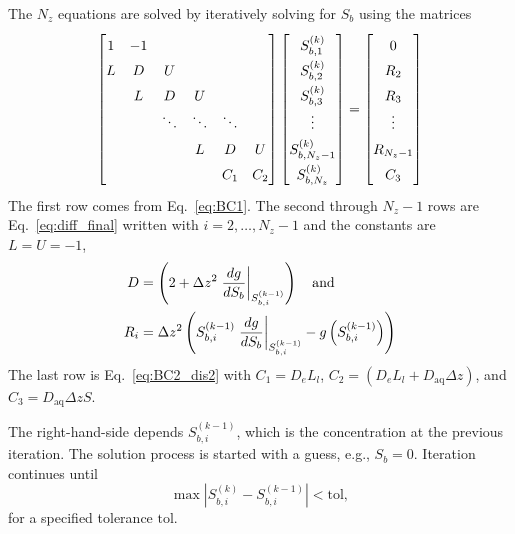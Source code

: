 \documentclass[letterpaper, twoside]{article}
\numberwithin{equation}{section}
\begin{document}
The $N_z$ equations are solved by iteratively solving for $S_b$ using the matrices
\begin{equation}
  \label{eq:system}
  \renewcommand*{\arraystretch}{1.5}
  \begin{bmatrix}
    1 &-1  &   &   &   & \\
    L &  D & U &  &   & \\
    ~ & L &  D & U &  & \\
    ~ & ~ & \ddots &  \ddots & \ddots & \\
    ~ & ~ & ~ & L &  D & U\\
    ~ & ~ & ~ & ~ &  C_1 & C_2  
  \end{bmatrix}
  \begin{bmatrix}
    S_{b,1}^{(k)}\\
    S_{b,2}^{(k)}\\
    S_{b,3}^{(k)}\\
   \vdots\\
    S_{b,N_z-1}^{(k)}\\
    S_{b,N_z}^{(k)}
  \end{bmatrix}
  =
    \begin{bmatrix}
   0\\
    R_{2}\\
    R_{3}\\
    \vdots\\
    R_{N_z-1}\\
    C_3
  \end{bmatrix}
\end{equation}
The first row comes from Eq.~\ref{eq:BC1}.
The second through $N_z-1$ rows are Eq.~\ref{eq:diff_final} written with $i=2,\dots,N_z-1$ and the constants are $L=U=-1$,
\begin{align*}
  D&=\left( 2 +\Delta z^2\left.\frac{d g}{d S_b}\right|_{S_{b,i}^{(k-1)}}\right)\text{\quad and}\\
  R_i&=\Delta z^2\left( S_{b,i}^{(k-1)} \left.\frac{d g}{d S_b}\right|_{S_{b,i}^{(k-1)}} - g\left(S_{b,i}^{(k-1)}\right)\right) 
\end{align*}
The last row is Eq.~\ref{eq:BC2_dis2} with $C_1=D_e L_l$, $C_2=\left(D_e L_l + D_{\mathrm{aq}} \Delta z\right)$, and $C_3=D_{\mathrm{aq}} \Delta z S$.

The right-hand-side depends $S_{b,i}^{(k-1)}$, which is the concentration at the previous iteration.  The solution process is started with a guess, e.g., $S_b=0$. Iteration continues until
\begin{equation*}
  \max\left| S_{b,i}^{(k)} - S_{b,i}^{(k-1)} \right| < \mathrm{tol},
\end{equation*}
for a specified tolerance $\mathrm{tol}$.
\end{document}
